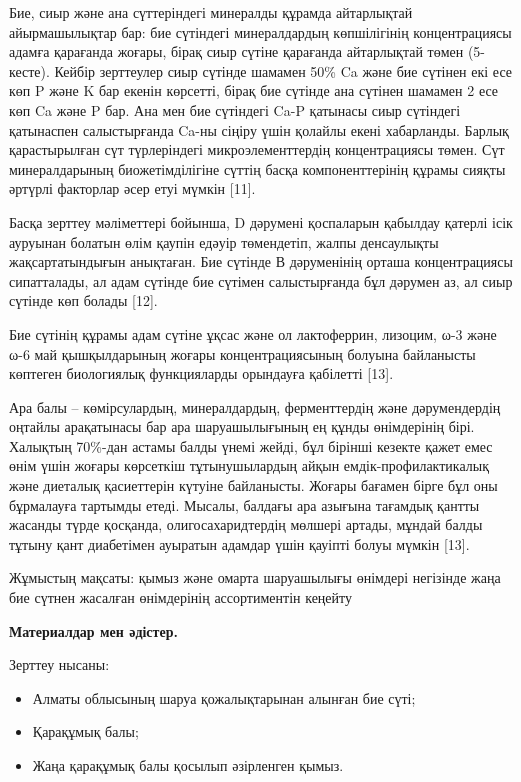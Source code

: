 \begin{multicols}{2}
Бие, сиыр және ана сүттеріндегі минералды құрамда айтарлықтай
айырмашылықтар бар: бие сүтіндегі минералдардың көпшілігінің
концентрациясы адамға қарағанда жоғары, бірақ сиыр сүтіне қарағанда
айтарлықтай төмен (5-кесте). Кейбір зерттеулер сиыр сүтінде шамамен 50\%
Ca және бие сүтінен екі есе көп P және K бар екенін көрсетті, бірақ бие
сүтінде ана сүтінен шамамен 2 есе көп Ca және P бар. Ана мен бие
сүтіндегі Ca-P қатынасы сиыр сүтіндегі қатынаспен салыстырғанда Ca-ны
сіңіру үшін қолайлы екені хабарланды. Барлық қарастырылған сүт
түрлеріндегі микроэлементтердің концентрациясы төмен. Сүт минералдарының
биожетімділігіне сүттің басқа компоненттерінің құрамы сияқты әртүрлі
факторлар әсер етуі мүмкін {[}11{]}.

Басқа зерттеу мәліметтері бойынша, D дәрумені қоспаларын қабылдау
қатерлі ісік ауруынан болатын өлім қаупін едәуір төмендетіп, жалпы
денсаулықты жақсартатындығын анықтаған. Бие сүтінде В дәруменінің орташа
концентрациясы сипатталады, ал адам сүтінде бие сүтімен салыстырғанда
бұл дәрумен аз, ал сиыр сүтінде көп болады {[}12{]}.

Бие сүтінің құрамы адам сүтіне ұқсас және ол лактоферрин, лизоцим, ω-3
және ω-6 май қышқылдарының жоғары концентрациясының болуына байланысты
көптеген биологиялық функцияларды орындауға қабілетті {[}13{]}.

Ара балы -- көмірсулардың, минералдардың, ферменттердің және
дәрумендердің оңтайлы арақатынасы бар ара шаруашылығының ең құнды
өнімдерінің бірі. Халықтың 70\%-дан астамы балды үнемі жейді, бұл
бірінші кезекте қажет емес өнім үшін жоғары көрсеткіш тұтынушылардың
айқын емдік-профилактикалық және диеталық қасиеттерін күтуіне
байланысты. Жоғары бағамен бірге бұл оны бұрмалауға тартымды етеді.
Мысалы, балдағы ара азығына тағамдық қантты жасанды түрде қосқанда,
олигосахаридтердің мөлшері артады, мұндай балды тұтыну қант диабетімен
ауыратын адамдар үшін қауіпті болуы мүмкін {[}13{]}.

Жұмыстың мақсаты: қымыз және омарта шаруашылығы өнімдері негізінде жаңа
бие сүтнен жасалған өнімдерінің ассортиментін кеңейту

{\bfseries Материалдар мен әдістер.}

Зерттеу нысаны:

\begin{itemize}
\item
  Алматы облысының шаруа қожалықтарынан алынған бие сүті;
\item
  Қарақұмық балы;
\item
  Жаңа қарақұмық балы қосылып әзірленген қымыз.
\end{itemize}


\end{multicols}

